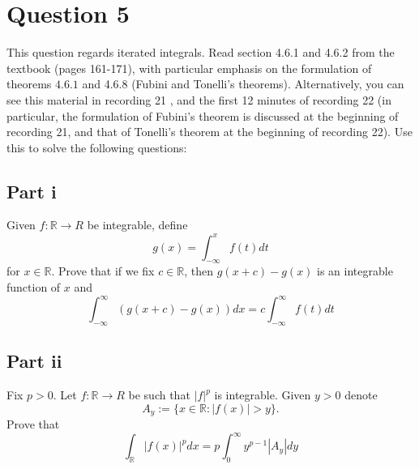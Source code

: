 \section{Question 5}

\begin{question}
    This question regards iterated integrals. Read section 4.6.1 and 4.6.2 from the textbook (pages 161-171), with particular emphasis on the formulation of theorems $4.6 .1$ and 4.6.8 (Fubini and Tonelli's theorems). Alternatively, you can see this material in recording 21 , and the first 12 minutes of recording 22 (in particular, the formulation of Fubini's theorem is discussed at the beginning of recording 21, and that of Tonelli's theorem at the beginning of recording 22). Use this to solve the following questions:
\end{question}

\subsection{Part i}

\begin{question}
    Given $f: \mathbb{R} \rightarrow R$ be integrable, define
    $$
    g(x)=\int_{-\infty}^x f(t) d t
    $$
    for $x \in \mathbb{R}$. Prove that if we fix $c \in \mathbb{R}$, then $g(x+c)-g(x)$ is an integrable function of $x$ and
    $$
    \int_{-\infty}^{\infty}(g(x+c)-g(x)) d x=c \int_{-\infty}^{\infty} f(t) d t
    $$
\end{question}

\begin{answer}
    
\end{answer}

\subsection{Part ii}

\begin{question}
    Fix $p>0$. Let $f: \mathbb{R} \rightarrow R$ be such that $|f|^p$ is integrable. Given $y>0$ denote
    $$
    A_y:=\{x \in \mathbb{R}:|f(x)|>y\} .
    $$
    Prove that
    $$
    \int_{\mathbb{R}}|f(x)|^p d x=p \int_0^{\infty} y^{p-1}\left|A_y\right| d y
    $$
\end{question}

\begin{answer}
    
\end{answer}
